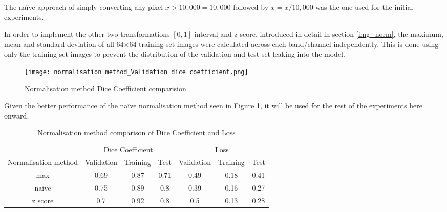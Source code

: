The na\"ive approach of simply converting any pixel $x>10,000=10,000$ followed by $x=x/10,000$ was the one used for the initial experiments.

In order to implement the other two transformations $[0,1]$ interval and z-score, introduced in detail in section \ref{img_norm}, the maximum, mean and standard deviation of all $64$×$64$ training set images were calculated across each band/channel independently. This is done using only the training set images to prevent the distribution of the validation and test set leaking into the model.
\begin{figure}[hbt!]
    \centering
    \texttt{[image: normalisation method\_Validation dice coefficient.png]}
    \caption{Normalisation method Dice Coefficient comparision}
    \label{norm_dice}
\end{figure}

Given the better performance of the  na\"ive normalisation method seen in Figure \ref{norm_dice}, it will be used for the rest of the experiments here onward.
\begin{table}[ht!] 
    \begin{center}
    \begin{tabular}{ccccccc} 
    \toprule
       & \multicolumn{3}{c}{Dice Coefficient}     & \multicolumn{3}{c}{Loss} \\
    Normalisation method & Validation & Training & Test & Validation    & Training    & Test   \\ \midrule
    max & 0.69 & 0.87 & 0.71 & 0.49 & 0.18 & 0.41  \\ \rowcolor{lightgray} naive & 0.75 & 0.89 & 0.8 & 0.39 & 0.16 & 0.27  \\ z score & 0.7 & 0.92 & 0.8 & 0.5 & 0.13 & 0.28  \\

    \bottomrule
    \end{tabular}
  \end{center} 
  \caption{Normalisation method comparison of Dice Coefficient and Loss}\label{tab_norm}
\end{table}
